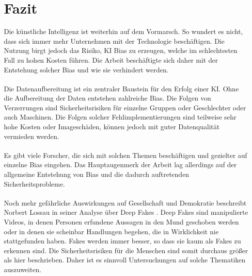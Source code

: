 \documentclass[12pt,oneside,a4paper,parskip]{scrbook}
\begin{document}
\chapter{Fazit}
Die künstliche Intelligenz ist weiterhin auf dem Vormarsch. So wundert es nicht, dass sich immer mehr Unternehmen mit der Technologie beschäftigen. Die Nutzung birgt jedoch das Risiko, KI Bias zu erzeugen, welche im schlechtesten Fall zu hohen Kosten führen. Die Arbeit beschäftigte sich daher mit der Entstehung solcher Bias und wie sie verhindert werden.
\\\\
Die Datenaufbereitung ist ein zentraler Baustein für den Erfolg einer KI. Ohne die Aufbereitung der Daten entstehen zahlreiche Bias. Die Folgen von Verzerrungen sind Sicherheitsrisiken für einzelne Gruppen oder Geschlechter oder auch Maschinen. Die Folgen solcher Fehlimplementierungen sind teilweise sehr hohe Kosten oder Imageschäden, können jedoch mit guter Datenqualität vermieden werden.
\\\\
Es gibt viele Forscher, die sich mit solchen Themen beschäftigen und gezielter auf einzelne Bias eingehen. Das Hauptaugenmerk der Arbeit lag allerdings auf der allgemeine Entstehung von Bias und die dadurch auftretenden Sicherheitsprobleme.
\\\\
Noch mehr gefährliche Auswirkungen auf Gesellschaft und Demokratie beschreibt Norbert Lossau in seiner Analyse über Deep Fakes \cite{deepFake}. Deep Fakes sind manipulierte Videos, in denen Personen erfundene Aussagen in den Mund geschoben werden oder in denen sie scheinbar Handlungen begehen, die in Wirklichkeit nie stattgefunden haben. Fakes werden immer besser, so dass sie kaum als Fakes zu erkennen sind. Die Sicherheitsrisiken für die Menschen sind somit durchaus größer als hier beschrieben. Daher ist es sinnvoll Untersuchungen auf solche Thematiken auszuweiten.

\backmatter


\cleardoublepage
{}
{}
\printbibliography
\end{document}
